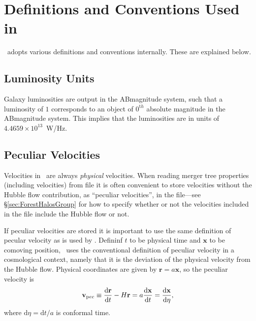 \chapter{Definitions and Conventions Used in \glc}

\glc\ adopts various definitions and conventions internally. These are explained below.

\section{Luminosity Units}

Galaxy luminosities are output in the \gls{ABmagnitude} system, such that a luminosity of $1$ corresponds to an object of $0^{\mathrm th}$ absolute magnitude in the \gls{ABmagnitude} system. This implies that the luminosities are in units of $4.4659\times 10^{13}$~W/Hz.

\section{Peculiar Velocities}\label{sec:GalacticusVelocityDefinitions}

Velocities in \glc\ are always \emph{physical} velocities. When reading merger tree properties (including velocities) from file it is often convenient to store velocities without the Hubble flow contribution, as ``peculiar velocities'', in the file---see \S\ref{sec:ForestHalosGroup} for how to specify whether or not  the velocities included in the file include the Hubble flow or not.

If peculiar velocities are stored it is important to use the same definition of pecular velocity as is used by \glc. Defininf $t$ to be physical time and ${\mathbf x}$ to be comoving position, \glc\ uses the conventional definition of peculiar velocity in a cosmological context, namely that it is the deviation of the physical velocity from the Hubble flow. Physical coordinates are given by ${\mathbf r} = a{\mathbf x}$, so the peculiar velocity is
\begin{equation}
{\mathbf v}_{\mathrm pec} \equiv {{\mathrm d} {\mathbf r} \over {\mathrm d} t} - H {\mathbf r} = a {{\mathrm d} {\mathbf x}\over{\mathrm d} t} = {{\mathrm d}{\mathbf x}\over{\mathrm d}\eta},
\end{equation}
where ${\mathrm d}\eta = {\mathrm d}t/a$ is conformal time. 
